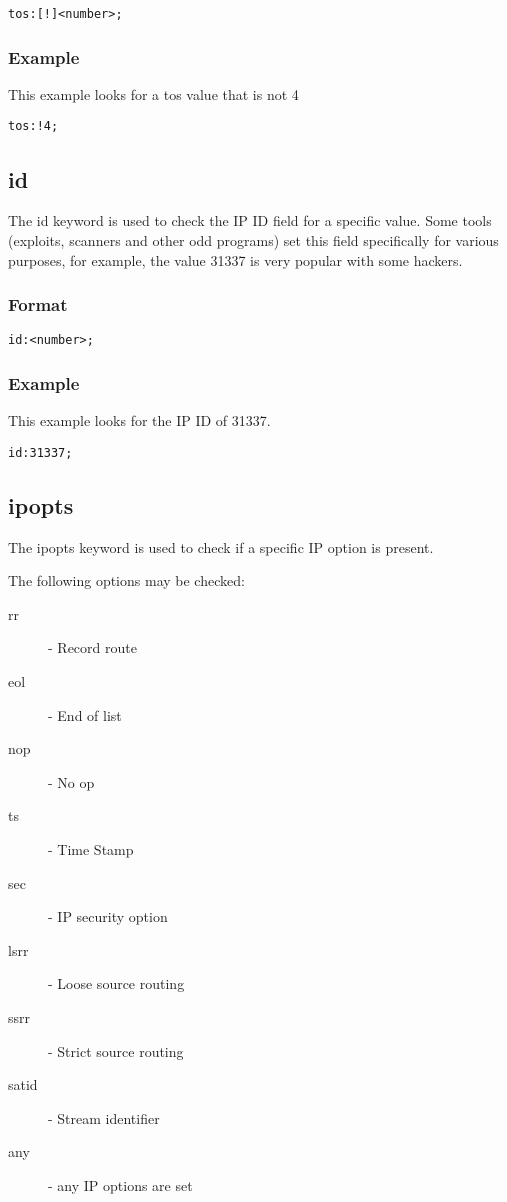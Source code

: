 \documentclass[english]{report}
\begin{document}
\begin{verbatim}
tos:[!]<number>;
\end{verbatim}

\subsubsection{Example}

This example looks for a tos value that is not 4
\begin{verbatim}
tos:!4;
\end{verbatim}

\subsection{id}

The id keyword is used to check the IP ID field for a specific value.  Some
tools (exploits, scanners and other odd programs) set this field specifically
for various purposes, for example, the value 31337 is very popular with some
hackers. 

\subsubsection{Format}

\begin{verbatim}
id:<number>;
\end{verbatim}

\subsubsection{Example}

This example looks for the IP ID of 31337.
\begin{verbatim}
id:31337;
\end{verbatim}

\subsection{ipopts}

The ipopts keyword is used to check if a specific IP option is present.

The following options may be checked:
\begin{description}
\item [rr] - Record route 
\item [eol] - End of list 
\item [nop] - No op 
\item [ts] - Time Stamp 
\item [sec] - IP security option 
\item [lsrr] - Loose source routing 
\item [ssrr] - Strict source routing 
\item [satid] - Stream identifier
\item [any] - any IP options are set
\end{description}
\end{document}
